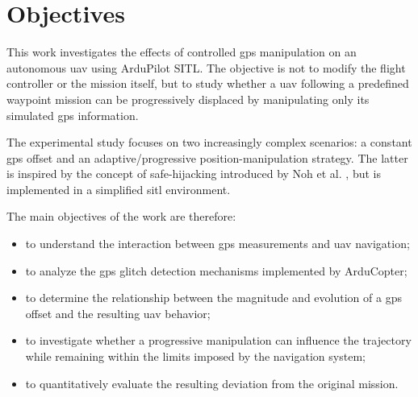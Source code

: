 \section{Objectives}
This work investigates the effects of controlled \gls{gps} manipulation on an autonomous \gls{uav} using ArduPilot SITL.
The objective is not to modify the flight controller or the mission itself, but to study whether a \gls{uav} following a predefined waypoint mission can be progressively displaced by manipulating only its simulated \gls{gps} information.

The experimental study focuses on two increasingly complex scenarios: a constant \gls{gps} offset and an adaptive/progressive position-manipulation strategy.
The latter is inspired by the concept of safe-hijacking introduced by Noh et al. \cite{noh2019tractorbeam}, but is implemented in a simplified \gls{sitl} environment.

The main objectives of the work are therefore:
\begin{itemize}
    \item to understand the interaction between \gls{gps} measurements and \gls{uav} navigation;
    \item to analyze the \gls{gps} glitch detection mechanisms implemented by ArduCopter;
    \item to determine the relationship between the magnitude and evolution of a \gls{gps} offset and the resulting \gls{uav} behavior;
    \item to investigate whether a progressive manipulation can influence the trajectory while remaining within the limits imposed by the navigation system;
    \item to quantitatively evaluate the resulting deviation from the original mission.
\end{itemize}